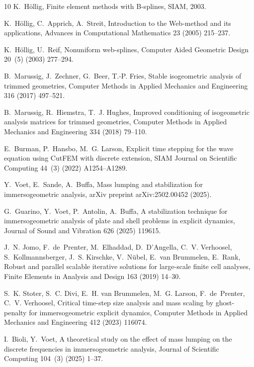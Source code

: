 \documentclass{article}
\numberwithin{equation}{section}
\theoremstyle{definition}
\begin{document}
\begin{thebibliography}{10}
K.~H{\"o}llig, Finite element methods with {B}-splines, SIAM, 2003.

K.~H{\"o}llig, C.~Apprich, A.~Streit, Introduction to the {Web}-method and its applications, Advances in Computational Mathematics 23 (2005) 215--237.

K.~H{\"o}llig, U.~Reif, Nonuniform web-splines, Computer Aided Geometric Design 20~(5) (2003) 277--294.

B.~Marussig, J.~Zechner, G.~Beer, T.-P. Fries, Stable isogeometric analysis of trimmed geometries, Computer Methods in Applied Mechanics and Engineering 316 (2017) 497--521.

B.~Marussig, R.~Hiemstra, T.~J. Hughes, Improved conditioning of isogeometric analysis matrices for trimmed geometries, Computer Methods in Applied Mechanics and Engineering 334 (2018) 79--110.

E.~Burman, P.~Hansbo, M.~G. Larson, Explicit time stepping for the wave equation using {CutFEM} with discrete extension, SIAM Journal on Scientific Computing 44~(3) (2022) A1254--A1289.

Y.~Voet, E.~Sande, A.~Buffa, Mass lumping and stabilization for immersogeometric analysis, arXiv preprint arXiv:2502.00452 (2025).

G.~Guarino, Y.~Voet, P.~Antolin, A.~Buffa, A stabilization technique for immersogeometric analysis of plate and shell problems in explicit dynamics, Journal of Sound and Vibration 626 (2025) 119615.

J.~N. Jomo, F.~de~Prenter, M.~Elhaddad, D.~D'Angella, C.~V. Verhoosel, S.~Kollmannsberger, J.~S. Kirschke, V.~N{\"u}bel, E.~van Brummelen, E.~Rank, Robust and parallel scalable iterative solutions for large-scale finite cell analyses, Finite Elements in Analysis and Design 163 (2019) 14--30.

S.~K. Stoter, S.~C. Divi, E.~H. van Brummelen, M.~G. Larson, F.~de~Prenter, C.~V. Verhoosel, Critical time-step size analysis and mass scaling by ghost-penalty for immersogeometric explicit dynamics, Computer Methods in Applied Mechanics and Engineering 412 (2023) 116074.

I.~Bioli, Y.~Voet, A theoretical study on the effect of mass lumping on the discrete frequencies in immersogeometric analysis, Journal of Scientific Computing 104~(3) (2025) 1--37.


\end{thebibliography}
\end{document}
